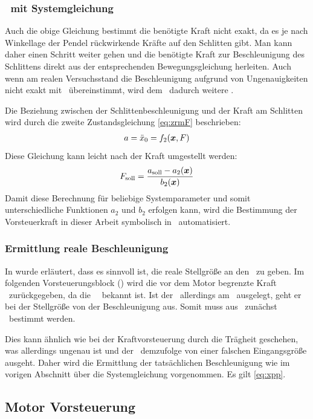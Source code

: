 \subsubsection{\vorst\  mit Systemgleichung}
Auch die obige Gleichung bestimmt die benötigte Kraft nicht exakt, da es je nach Winkellage der Pendel rückwirkende Kräfte auf den Schlitten gibt.
Man kann daher einen Schritt weiter gehen und die benötigte Kraft zur Beschleunigung des Schlittens direkt aus der entsprechenden Bewegungsgleichung herleiten. 
Auch wenn am realen Versuchsstand die Beschleunigung aufgrund von Ungenauigkeiten nicht exakt mit \asoll\ übereinstimmt, wird dem \avr\ dadurch weitere .

Die Beziehung zwischen der Schlittenbeschleunigung und der Kraft am Schlitten wird durch die zweite Zustandsgleichung \eqref{eq:zrmF} beschrieben:
\begin{align}
	a=\ddot{x}_0=f_2(\boldsymbol{x},F)
	\label{eq:xpp}
\end{align}
Diese Gleichung kann leicht nach der Kraft umgestellt werden:
\begin{align}
	F_{\mathrm{soll}}=\frac{a_{\mathrm{soll}}-a_2(\boldsymbol{x})}{b_2(\boldsymbol{x})}
\end{align}
Damit diese Berechnung für beliebige Systemparameter und somit unterschiedliche Funktionen $a_2$ und $b_2$ erfolgen kann, wird die Bestimmung der Vorsteuerkraft in dieser Arbeit symbolisch in \ml\ automatisiert.

\subsubsection{Ermittlung reale Beschleunigung}
In  wurde erläutert, dass es sinnvoll ist, die reale Stellgröße an den \beob\ zu geben.
Im folgenden Vorsteuerungsblock () wird die vor dem Motor begrenzte Kraft \freal\ zurückgegeben, da die \sgb\ \fmax\ bekannt ist.
Ist der \beob\ allerdings am \bss\ ausgelegt, geht er bei der Stellgröße von der Beschleunigung aus.
Somit muss aus \freal\ zunächst \areal\ bestimmt werden.

Dies kann ähnlich wie bei der Kraftvorsteuerung durch die Trägheit geschehen, was allerdings ungenau ist und der \beob\ demzufolge von einer falschen Eingangsgröße ausgeht.
Daher wird die Ermittlung der tatsächlichen Beschleunigung wie im vorigen Abschnitt über die Systemgleichung vorgenommen.
Es gilt \eqref{eq:xpp}.



\subsection{Motor Vorsteuerung}\label{sec:motvorst}

